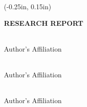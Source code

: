 \begin{titlepage}
    \begin{textblock*}{9in}(-0.25in, 0.15in)
        \begin{tcolorbox}[valign = center]
            \begin{center}
            \end{center}
        \end{tcolorbox}
    \end{textblock*}

    \vspace*{-1.7cm}
    \noindent
    
    \vspace{0.35in}
    \noindent\textcolor{urban-blue}{\MakeUppercase{\textbf{Research Report}}}
    
    
    \vspace{-0.25in}
    
    \begin{multicols}{4}
        \\
        Author's Affiliation
        
        \\
        Author's Affiliation
        
        \\
        Author's Affiliation
        

\end{multicols}
\end{titlepage}
